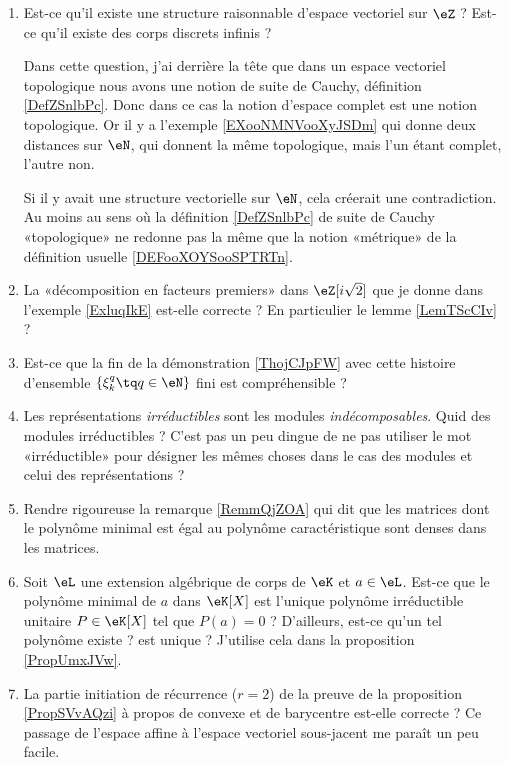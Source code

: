 \begin{enumerate}
    \item
        Est-ce qu'il existe une structure raisonnable d'espace vectoriel sur \( \eZ\) ? Est-ce qu'il existe des corps discrets infinis ? 

        Dans cette question, j'ai derrière la tête que dans un espace vectoriel topologique nous avons une notion de suite de Cauchy, définition \ref{DefZSnlbPc}. Donc dans ce cas la notion d'espace complet est une notion topologique. Or il y a l'exemple \ref{EXooNMNVooXyJSDm} qui donne deux distances sur \( \eN\), qui donnent la même topologique, mais l'un étant complet, l'autre non.

        Si il y avait une structure vectorielle sur \( \eN\), cela créerait une contradiction. Au moins au sens où la définition \ref{DefZSnlbPc} de suite de Cauchy «topologique» ne redonne pas la même que la notion «métrique» de la définition usuelle \ref{DEFooXOYSooSPTRTn}.
    \item
        La «décomposition en facteurs premiers» dans \( \eZ[i\sqrt{2}]\) que je donne dans l'exemple \ref{ExluqIkE} est-elle correcte ? En particulier le lemme \ref{LemTScCIv} ?
    \item
        Est-ce que la fin de la démonstration \ref{ThojCJpFW} avec cette histoire d'ensemble \( \{ \xi_k^q\tq q\in \eN \}\) fini est compréhensible ?
    \item
        Les représentations \emph{irréductibles} sont les modules \emph{indécomposables}. Quid des modules irréductibles ? C'est pas un peu dingue de ne pas utiliser le mot «irréductible» pour désigner les mêmes choses dans le cas des modules et celui des représentations ?
    \item
        Rendre rigoureuse la remarque \eqref{RemmQjZOA} qui dit que les matrices dont le polynôme minimal est égal au polynôme caractéristique sont denses dans les matrices.
    \item
        Soit \( \eL\) une extension algébrique de corps de \( \eK\) et \( a\in \eL\). Est-ce que le polynôme minimal de \( a\) dans \( \eK[X]\) est l'unique polynôme irréductible unitaire \( P\in \eK[X]\) tel que \( P(a)=0\) ? D'ailleurs, est-ce qu'un tel polynôme existe ? est unique ? J'utilise cela dans la proposition \ref{PropUmxJVw}.
    \item
        La partie initiation de récurrence (\( r=2\)) de la preuve de la proposition \ref{PropSVvAQzi} à propos de convexe et de barycentre est-elle correcte ? Ce passage de l'espace affine à l'espace vectoriel sous-jacent me paraît un peu facile.

\end{enumerate}
